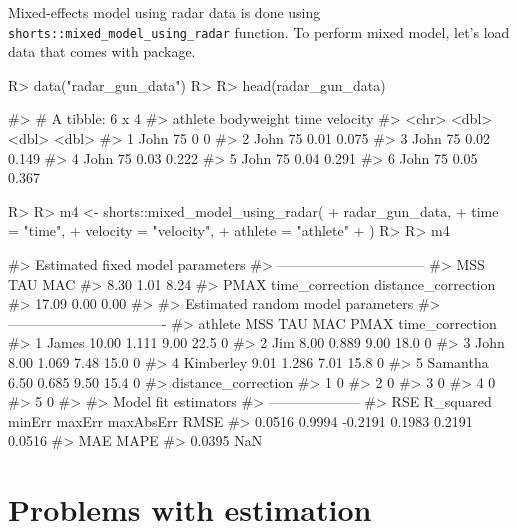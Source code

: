 \documentclass[
]{jss}
\begin{document}
Mixed-effects model using radar data is done using \texttt{shorts::mixed\_model\_using\_radar} function. To perform mixed model, let's load data that comes with  package.

\begin{CodeChunk}
\begin{CodeInput}
R> data("radar_gun_data")
R> 
R> head(radar_gun_data)
\end{CodeInput}
\begin{CodeOutput}
#> # A tibble: 6 x 4
#>   athlete bodyweight  time velocity
#>   <chr>        <dbl> <dbl>    <dbl>
#> 1 John            75  0       0    
#> 2 John            75  0.01    0.075
#> 3 John            75  0.02    0.149
#> 4 John            75  0.03    0.222
#> 5 John            75  0.04    0.291
#> 6 John            75  0.05    0.367
\end{CodeOutput}
\begin{CodeInput}
R> 
R> m4 <- shorts::mixed_model_using_radar(
+   radar_gun_data,
+   time = "time",
+   velocity = "velocity",
+   athlete = "athlete"
+ )
R> 
R> m4
\end{CodeInput}
\begin{CodeOutput}
#> Estimated fixed model parameters
#> --------------------------------
#>                 MSS                 TAU                 MAC 
#>                8.30                1.01                8.24 
#>                PMAX     time_correction distance_correction 
#>               17.09                0.00                0.00 
#> 
#> Estimated random model parameters
#> ----------------------------------
#>     athlete   MSS   TAU  MAC PMAX time_correction
#> 1     James 10.00 1.111 9.00 22.5               0
#> 2       Jim  8.00 0.889 9.00 18.0               0
#> 3      John  8.00 1.069 7.48 15.0               0
#> 4 Kimberley  9.01 1.286 7.01 15.8               0
#> 5  Samantha  6.50 0.685 9.50 15.4               0
#>   distance_correction
#> 1                   0
#> 2                   0
#> 3                   0
#> 4                   0
#> 5                   0
#> 
#> Model fit estimators
#> --------------------
#>       RSE R_squared    minErr    maxErr maxAbsErr      RMSE 
#>    0.0516    0.9994   -0.2191    0.1983    0.2191    0.0516 
#>       MAE      MAPE 
#>    0.0395       NaN
\end{CodeOutput}
\end{CodeChunk}

\hypertarget{problems-with-estimation}{%
\section{Problems with estimation}\label{problems-with-estimation}}
\end{document}
